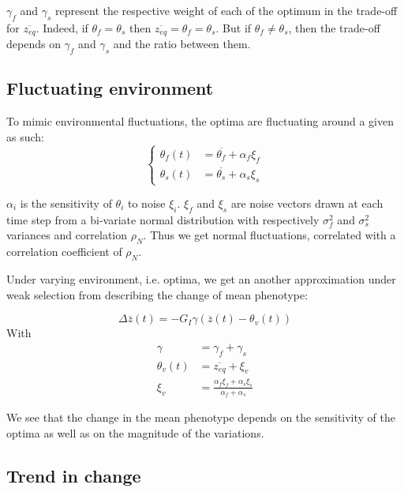 $\gamma_f$ and $\gamma_s$ represent the respective weight of each of the optimum in the trade-off for $\overline{z_{eq}}$. Indeed, if $\theta_f = \theta_s$ then $\overline{z_{eq}} = \theta_f = \theta_s$. But if $\theta_f \neq \theta_s$, then the trade-off depends on $\gamma_f$ and $\gamma_s$ and the ratio between them.

\subsection*{Fluctuating environment}

To mimic environmental fluctuations, the optima are fluctuating around a given as such:
\begin{equation}
\left\{
	\begin{aligned}
		\theta_f(t) &= \overline{\theta_f} + \alpha_f \xi_f \\
		\theta_s(t) &= \overline{\theta_s} + \alpha_s \xi_s
	\end{aligned}
\right.
\end{equation}

$\alpha_i$ is the sensitivity of $\theta_i$ to noise $\xi_i$. $\xi_f$ and $\xi_s$ are noise vectors drawn at each time step from a bi-variate normal distribution with respectively $\sigma_f^2$ and $\sigma_s^2$ variances and correlation $\rho_N$. Thus we get normal fluctuations, correlated with a correlation coefficient of $\rho_N$.

Under varying environment, i.e. optima, we get an another approximation under weak selection from \citep{engen_evolution_2011} describing the change of mean phenotype:

\begin{equation}
	\label{eq:zfluct}
	\Delta \overline{z}(t) = - G_I \gamma (\overline{z}(t) - \theta_v(t))
\end{equation}
With
\begin{subequations}
	\begin{align}
		\gamma &= \gamma_f + \gamma_s \\
		\theta_v(t) &= \overline{z_{eq}} + \xi_v \\
		\xi_v &= \frac{\alpha_f \xi_f + \alpha_s \xi_s}{\alpha_f + \alpha_s}
	\end{align}
\end{subequations}

We see that the change in the mean phenotype depends on the sensitivity of the optima as well as on the magnitude of the variations.

\subsection*{Trend in change}

